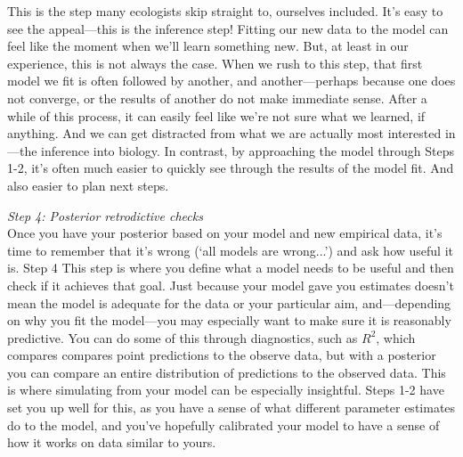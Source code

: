 \documentclass[11pt]{article}
\begin{document}
{This is the step many ecologists skip straight to, ourselves included. It's easy to see the appeal---this is the inference step! Fitting our new data to the model can feel like the moment when we'll learn something new. But, at least in our experience, this is not always the case. When we rush to this step, that first model we fit is often followed by another, and another---perhaps because one does not converge, or the results of another do not make immediate sense. After a while of this process, it can easily feel like we're not sure what we learned, if anything. And we can get distracted from what we are actually most interested in---the inference into biology. In contrast, by approaching the model through Steps 1-2, it's often much easier to quickly see through the results of the model fit. And also easier to plan next steps. 
 

\emph{Step 4: Posterior retrodictive checks} \\
Once you have your posterior based on your model and new empirical data, it's time to remember that it's wrong (`all models are wrong...') and ask how useful it is. Step 4 This step is where you define what a model needs to be useful and then check if it achieves that goal. Just because your model gave you estimates doesn't mean the model is adequate for the data or your particular aim, and---depending on why you fit the model---you may especially want to make sure it is reasonably predictive. You can do some of this through diagnostics, such as $R^2$, which compares compares point predictions to the observe data, but with a posterior you can compare an entire distribution of predictions to the observed data. This is where simulating from your model can be especially insightful. Steps 1-2 have set you up well for this, as you have a sense of what different parameter estimates do to the model, and you've hopefully calibrated your model to have a sense of how it works on data similar to yours.

}
\end{document}
